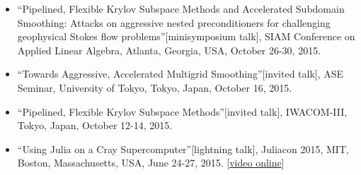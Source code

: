 \begin{itemize}
\item ``Pipelined, Flexible Krylov Subspace Methods and Accelerated Subdomain Smoothing: Attacks on aggressive nested preconditioners for challenging geophysical Stokes flow problems''[minisymposium talk], SIAM Conference on Applied Linear Algebra, Atlanta, Georgia, USA, October 26-30, 2015.
\item ``Towards Aggressive, Accelerated Multigrid Smoothing''[invited talk], ASE Seminar, University of Tokyo, Tokyo, Japan, October 16, 2015.
\item ``Pipelined, Flexible Krylov Subspace Methods''[invited talk], IWACOM-III, Tokyo, Japan, October 12-14, 2015.
\item ``Using Julia on a Cray Supercomputer''[lightning talk], Juliacon 2015, MIT, Boston, Massachusetts, USA, June 24-27, 2015. [\href{https://www.youtube.com/watch?v=NwyKz2KLdtY}{video online}]
\end{itemize}
